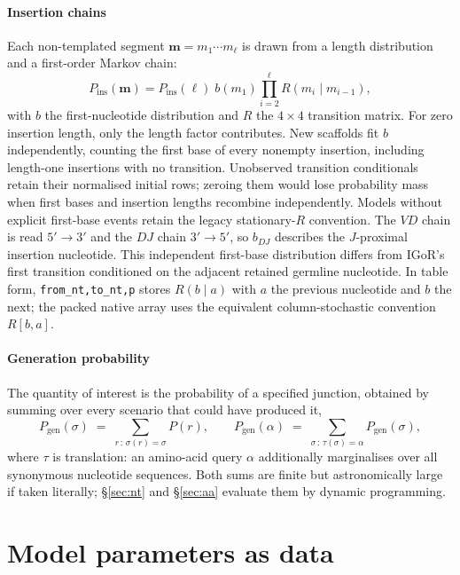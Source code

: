 \documentclass[11pt]{article}
\theoremstyle{oldplain}
\theoremstyle{oldrem}
\newcommand{\Pgen}{P_{\mathrm{gen}}}
\newcommand{\ins}{\mathrm{ins}}
\begin{document}
\paragraph{Insertion chains} Each non-templated segment $\mathbf{m}=m_1\cdots m_\ell$ is drawn from a
length distribution and a first-order Markov chain:
\begin{equation}\label{eq:ins}
  P_{\ins}(\mathbf{m}) = P_{\ins}(\ell)\; b(m_1)\prod_{i=2}^{\ell} R(m_i\mid m_{i-1}),
\end{equation}
with $b$ the first-nucleotide distribution and $R$ the $4\times4$ transition matrix.
For zero insertion length, only the length factor contributes. New scaffolds fit
$b$ independently, counting the first base of every nonempty insertion, including
length-one insertions with no transition. Unobserved transition conditionals
retain their normalised initial rows; zeroing them would lose probability mass
when first bases and insertion lengths recombine independently. Models without
explicit first-base events retain the legacy stationary-$R$ convention.
The $VD$ chain is read $5'\!\to\!3'$ and the $DJ$ chain $3'\!\to\!5'$, so $b_{DJ}$
describes the $J$-proximal insertion nucleotide. This independent first-base
distribution differs from IGoR's first transition conditioned on the adjacent
retained germline nucleotide. In table form, \texttt{from\_nt,to\_nt,p} stores
$R(b\mid a)$ with $a$ the previous nucleotide and $b$ the next; the packed native
array uses the equivalent column-stochastic convention $R[b,a]$.

\paragraph{Generation probability} The quantity of interest is the probability of a specified
junction, obtained by summing over every scenario that could have produced it,
\begin{equation}\label{eq:pgen}
  \Pgen(\sigma) \;=\; \sum_{r\,:\,\sigma(r)=\sigma} P(r),
  \qquad
  \Pgen(\alpha) \;=\; \sum_{\sigma\,:\,\tau(\sigma)=\alpha}\Pgen(\sigma),
\end{equation}
where $\tau$ is translation: an amino-acid query $\alpha$ additionally marginalises over all synonymous
nucleotide sequences. Both sums are finite but astronomically large if taken literally; \S\ref{sec:nt}
and \S\ref{sec:aa} evaluate them by dynamic programming.

\section{Model parameters as data}\label{sec:tables}
\end{document}

